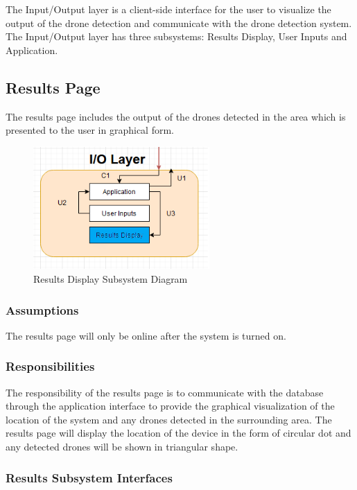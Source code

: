 The Input/Output layer is a client-side interface for the user to visualize the output of the drone detection and communicate with the drone detection system. The Input/Output layer has three subsystems: Results Display, User Inputs and Application.

\subsection{Results Page}
The results page includes the output of the drones detected in the area which is presented to the user in graphical form. 


\begin{figure}[h!]
	\centering
 	\includegraphics[width=0.60\textwidth]{images/results.png}
 \caption{Results Display Subsystem Diagram}
\end{figure}

\subsubsection{Assumptions}
The results page will only be online after the system is turned on.

\subsubsection{Responsibilities}
The responsibility of the results page is to communicate with the database through the application interface to provide the graphical visualization of the location of the system and any drones detected in the surrounding area. The results page will display the location of the device in the form of circular dot and any detected drones will be shown in triangular shape.

\subsubsection{Results Subsystem Interfaces}

